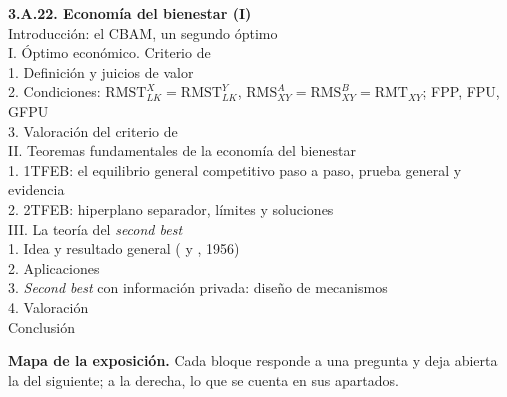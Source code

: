 \documentclass[11pt]{article}
\begin{document}
\begin{esquema}
\textbf{3.A.22. Economía del bienestar (I)}\\[2pt]
Introducción: el CBAM, un segundo óptimo\\
I. Óptimo económico. Criterio de \\
\hspace*{1.5em}1. Definición y juicios de valor\\
\hspace*{1.5em}2. Condiciones: $\mathrm{RMST}^X_{LK}=\mathrm{RMST}^Y_{LK}$, $\mathrm{RMS}^A_{XY}=\mathrm{RMS}^B_{XY}=\mathrm{RMT}_{XY}$; FPP, FPU, GFPU\\
\hspace*{1.5em}3. Valoración del criterio de \\
II. Teoremas fundamentales de la economía del bienestar\\
\hspace*{1.5em}1. 1TFEB: el equilibrio general competitivo paso a paso, prueba general y evidencia\\
\hspace*{1.5em}2. 2TFEB: hiperplano separador, límites y soluciones\\
III. La teoría del \emph{second best}\\
\hspace*{1.5em}1. Idea y resultado general ( y , 1956)\\
\hspace*{1.5em}2. Aplicaciones\\
\hspace*{1.5em}3. \emph{Second best} con información privada: diseño de mecanismos\\
\hspace*{1.5em}4. Valoración\\
Conclusión
\end{esquema}

\begin{anotaciones}
\textbf{Mapa de la exposición.} Cada bloque responde a una pregunta y deja abierta la del siguiente; a la derecha, lo que se cuenta en sus apartados.
\begin{infografiacaja}
\caption{Mapa de la exposición: la pregunta de cada bloque y el hilo que los une}\label{figu:mapa-tema}
\end{infografiacaja}
\end{anotaciones}
\end{document}
